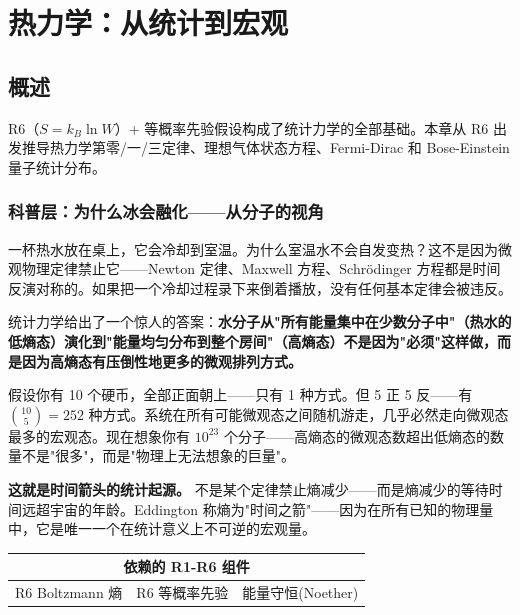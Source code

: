 \chapter{热力学：从统计到宏观}
\label{ch:thermodynamics}

\section{概述}

R6（$S = k_B \ln W$）+ 等概率先验假设构成了统计力学的全部基础。本章从 R6 出发推导热力学第零/一/三定律、理想气体状态方程、Fermi-Dirac 和 Bose-Einstein 量子统计分布。

\subsection{科普层：为什么冰会融化——从分子的视角}

一杯热水放在桌上，它会冷却到室温。为什么室温水不会自发变热？这不是因为微观物理定律禁止它——Newton 定律、Maxwell 方程、Schr\"{o}dinger 方程都是时间反演对称的。如果把一个冷却过程录下来倒着播放，没有任何基本定律会被违反。

统计力学给出了一个惊人的答案：\textbf{水分子从"所有能量集中在少数分子中"（热水的低熵态）演化到"能量均匀分布到整个房间"（高熵态）不是因为"必须"这样做，而是因为高熵态有压倒性地更多的微观排列方式。}

假设你有 10 个硬币，全部正面朝上——只有 1 种方式。但 5 正 5 反——有 ${10\choose 5}=252$ 种方式。系统在所有可能微观态之间随机游走，几乎必然走向微观态最多的宏观态。现在想象你有 $10^{23}$ 个分子——高熵态的微观态数超出低熵态的数量不是"很多"，而是"物理上无法想象的巨量"。

\textbf{这就是时间箭头的统计起源。} 不是某个定律禁止熵减少——而是熵减少的等待时间远超宇宙的年龄。Eddington 称熵为"时间之箭"——因为在所有已知的物理量中，它是唯一一个在统计意义上不可逆的宏观量。

\begin{center}
\small
\begin{tabular}{p{3.5cm}p{3.5cm}p{3cm}}
\toprule
\multicolumn{3}{c}{\textbf{依赖的 R1-R6 组件}} \\
\midrule
R6 Boltzmann 熵 & R6 等概率先验 & 能量守恒(Noether) \\
\bottomrule
\end{tabular}
\end{center}

